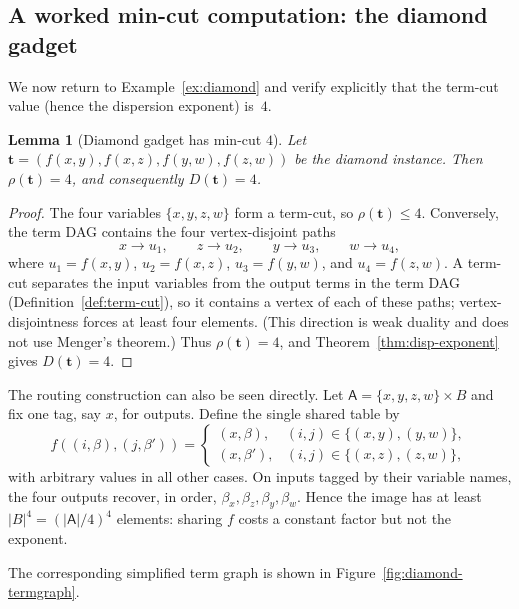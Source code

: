 \documentclass[11pt]{article}
\theoremstyle{definition}
\theoremstyle{plain}
\newtheorem{lemma}[definition]{Lemma}
\newcommand{\A}{\mathsf{A}}
\begin{document}
\subsection{A worked min-cut computation: the diamond gadget}
\label{subsec:diamond-maxflow}

We now return to Example~\ref{ex:diamond} and verify explicitly that the term-cut value
(hence the dispersion exponent) is~$4$.

\begin{lemma}[Diamond gadget has min-cut $4$]
\label{lem:diamond-maxflow}
Let $\mathbf t=(f(x,y),f(x,z),f(y,w),f(z,w))$ be the diamond instance.
Then $\rho(\mathbf t)=4$, and consequently $D(\mathbf t)=4$.
\end{lemma}

\begin{proof}
The four variables $\{x,y,z,w\}$ form a term-cut, so $\rho(\mathbf t)\le4$.
Conversely, the term DAG contains the four vertex-disjoint paths
\[
  x\to u_1,\qquad z\to u_2,\qquad y\to u_3,\qquad w\to u_4,
\]
where $u_1=f(x,y)$, $u_2=f(x,z)$, $u_3=f(y,w)$, and $u_4=f(z,w)$.
A term-cut separates the input variables from the output terms in the term DAG
(Definition~\ref{def:term-cut}), so it contains a vertex of each of these paths; vertex-disjointness
forces at least four elements.  (This direction is weak duality and does not use Menger's theorem.)  Thus
$\rho(\mathbf t)=4$, and Theorem~\ref{thm:disp-exponent} gives $D(\mathbf t)=4$.
\end{proof}

The routing construction can also be seen directly.  Let
$\A=\{x,y,z,w\}\times B$ and fix one tag, say $x$, for outputs.  Define the single shared table by
\[
f((i,\beta),(j,\beta'))=
\begin{cases}
(x,\beta), &(i,j)\in\{(x,y),(y,w)\},\\
(x,\beta'),&(i,j)\in\{(x,z),(z,w)\},
\end{cases}
\]
with arbitrary values in all other cases.  On inputs tagged by their variable names, the four outputs recover,
in order, $\beta_x,\beta_z,\beta_y,\beta_w$.  Hence the image has at least
$|B|^4=(|\A|/4)^4$ elements: sharing $f$ costs a constant factor but not the exponent.

The corresponding simplified term graph is shown in Figure~\ref{fig:diamond-termgraph}.
\end{document}
